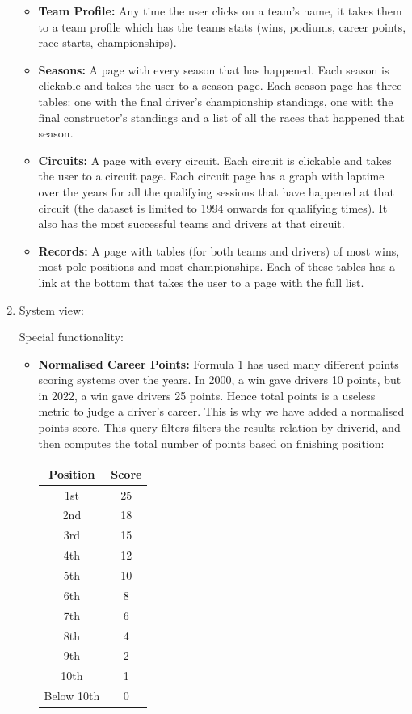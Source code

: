 \documentclass{article}
\begin{document}
\begin{enumerate}
\begin{itemize}
		\item \textbf{Team Profile:} Any time the user clicks on a team's name, it takes them to a team profile which has the teams stats (wins, podiums, career points, race starts, championships).
		\item \textbf{Seasons:} A page with every season that has happened. Each season is clickable and takes the user to a season page. Each season page has three tables: one with the final driver's championship standings, one with the final constructor's standings and a list of all the races that happened that season.
		\item \textbf{Circuits:} A page with every circuit. Each circuit is clickable and takes the user to a circuit page. Each circuit page has a graph with laptime over the years for all the qualifying sessions that have happened at that circuit (the dataset is limited to 1994 onwards for qualifying times). It also has the most successful teams and drivers at that circuit.
		\item \textbf{Records:} A page with tables (for both teams and drivers) of most wins, most pole positions and most championships. Each of these tables has a link at the bottom that takes the user to a page with the full list.
	\end{itemize}

	\item System view:

	Special functionality:
	\begin{itemize}
		\item \textbf{Normalised Career Points:} Formula 1 has used many different points scoring systems over the years. In 2000, a win gave drivers 10 points, but in 2022, a win gave drivers 25 points. Hence total points is a useless metric to judge a driver's career. This is why we have added a normalised points score. This query filters filters the results relation by driverid, and then computes the total number of points based on finishing position:
		
		\begin{tabular}{|c|c|}
			\hline
			\textbf{Position} & \textbf{Score}\\
			\hline
			1st & 25\\
			2nd & 18\\
			3rd & 15\\
			4th & 12\\
			5th & 10\\
			6th & 8\\
			7th & 6\\
			8th & 4\\
			9th & 2\\
			10th & 1\\
			Below 10th & 0\\
			\hline
		\end{tabular}


\end{itemize}
\end{enumerate}
\end{document}
